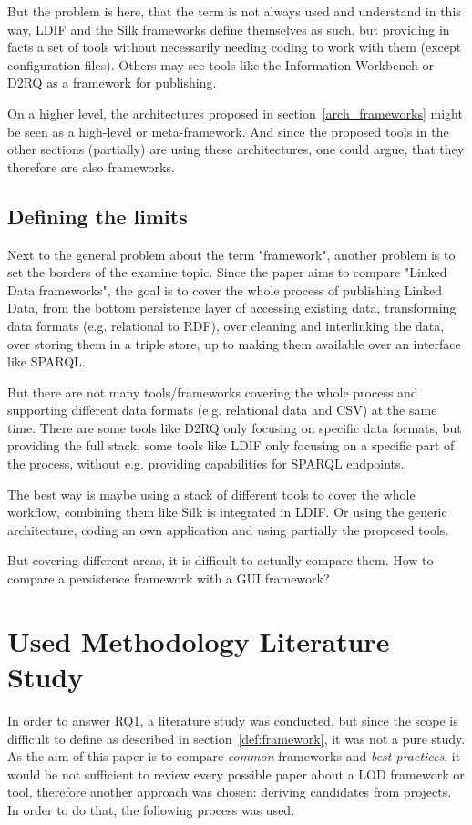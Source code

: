 But the problem is here, that the term is not always used and understand in this way, LDIF and the Silk frameworks define themselves as such, but providing in facts a set of tools without necessarily needing coding to work with them (except configuration files). Others may see tools like the Information Workbench or D2RQ as a framework for publishing.

On a higher level, the architectures proposed in section~\ref{arch_frameworks} might be seen as a high-level or meta-framework. And since the proposed tools in the other sections (partially) are using these architectures, one could argue, that they therefore are also frameworks.

\subsection{Defining the limits}

Next to the general problem about the term "framework", another problem is to set the borders of the examine topic. Since the paper aims to compare "Linked Data frameworks", the goal is to cover the whole process of publishing Linked Data, from the bottom persistence layer of accessing existing data, transforming data formats (e.g. relational to RDF), over cleaning and interlinking the data, over storing them in a triple store, up to making them available over an interface like SPARQL.

But there are not many tools/frameworks covering the whole process and supporting different data formats (e.g. relational data and CSV) at the same time. There are some tools like D2RQ only focusing on specific data formats, but providing the full stack, some tools like LDIF only focusing on a specific part of the process, without e.g. providing capabilities for SPARQL endpoints.

The best way is maybe using a stack of different tools to cover the whole workflow, combining them like Silk is integrated in LDIF. Or using the generic architecture, coding an own application and using partially the proposed tools.

But covering different areas, it is difficult to actually compare them. How to compare a persistence framework with a GUI framework?

\section{Used Methodology Literature Study}\label{meth_study}
In order to answer RQ1, a literature study was conducted, but since the scope is difficult to define as described in section~\ref{def:framework}, it was not a pure study. As the aim of this paper is to compare \textit{common} frameworks and \textit{best practices}, it would be not sufficient to review every possible paper about a LOD framework or tool, therefore another approach was chosen: deriving candidates from projects. In order to do that, the following process was used:

